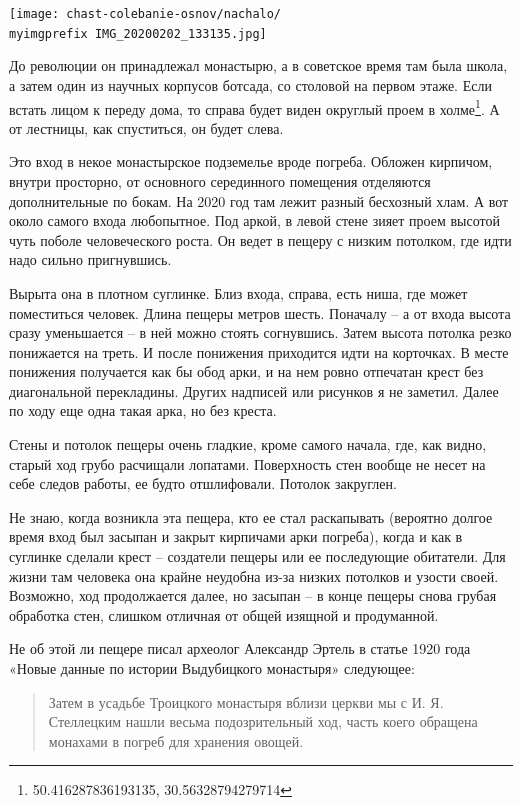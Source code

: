 \begin{center}
\texttt{[image: chast-colebanie-osnov/nachalo/\\myimgprefix IMG\_20200202\_133135.jpg]}
\end{center}

До революции он принадлежал монастырю, а в советское время там была школа, а затем один из научных корпусов ботсада, со столовой на первом этаже. Если встать лицом к переду дома, то справа будет виден округлый проем в холме\footnote{50.416287836193135, 30.56328794279714}. А от лестницы, как спуститься, он будет слева.

Это вход в некое монастырское подземелье вроде погреба. Обложен кирпичом, внутри просторно, от основного серединного помещения отделяются дополнительные по бокам. На 2020 год там лежит разный бесхозный хлам. А вот около самого входа любопытное. Под аркой, в левой стене зияет проем высотой чуть поболе человеческого роста. Он ведет в пещеру с низким потолком, где идти надо сильно пригнувшись.

Вырыта она в плотном суглинке. Близ входа, справа, есть ниша, где может поместиться человек. Длина пещеры метров шесть. Поначалу – а от входа высота сразу уменьшается – в ней можно стоять согнувшись. Затем высота потолка резко понижается на треть. И после понижения приходится идти на корточках. В месте понижения получается как бы обод арки, и на нем ровно отпечатан крест без диагональной перекладины. Других надписей или рисунков я не заметил. Далее по ходу еще одна такая арка, но без креста.

Стены и потолок пещеры очень гладкие, кроме самого начала, где, как видно, старый ход грубо расчищали лопатами. Поверхность стен вообще не несет на себе следов работы, ее будто отшлифовали. Потолок закруглен.

Не знаю, когда возникла эта пещера, кто ее стал раскапывать (вероятно долгое время вход был засыпан и закрыт кирпичами арки погреба), когда и как в суглинке сделали крест – создатели пещеры или ее последующие обитатели. Для жизни там человека она крайне неудобна из-за низких потолков и узости своей. Возможно, ход продолжается далее, но засыпан – в конце пещеры снова грубая обработка стен, слишком отличная от общей изящной и продуманной.

Не об этой ли пещере писал археолог Александр Эртель в статье 1920 года «Новые данные по истории Выдубицкого монастыря» следующее:

\begin{quotation}
Затем в усадьбе Троицкого монастыря вблизи церкви мы с И. Я. Стеллецким нашли весьма подозрительный ход, часть коего обращена монахами в погреб для хранения овощей.
\end{quotation}

